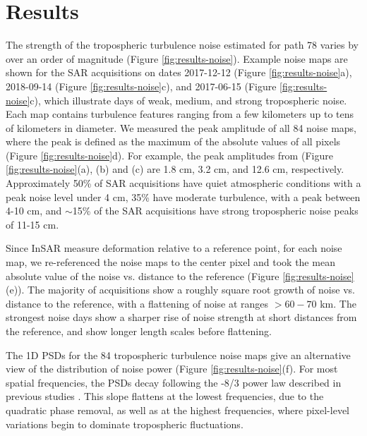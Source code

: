 \documentclass{utexasthesis}
\begin{document}
\section{Results}
\label{sec:results}

The strength of the tropospheric turbulence noise estimated for path 78 varies by over an order of magnitude (Figure \ref{fig:results-noise}). Example noise maps are shown for the SAR acquisitions on dates 2017-12-12 (Figure \ref{fig:results-noise}a), 2018-09-14 (Figure \ref{fig:results-noise}c), and 2017-06-15 (Figure \ref{fig:results-noise}c), which illustrate days of weak, medium, and strong tropospheric noise. Each map contains turbulence features ranging from a few kilometers up to tens of kilometers in diameter.  
We measured the peak amplitude of all 84 noise maps, where the peak is defined as the maximum of the absolute values of all pixels (Figure \ref{fig:results-noise}d). 
For example, the peak amplitudes from (Figure \ref{fig:results-noise}(a), (b) and (c) are 1.8 cm, 3.2 cm, and 12.6 cm, respectively.  Approximately 50\% of SAR acquisitions have quiet atmospheric conditions with a peak noise level under 4 cm, 35\% have moderate turbulence, with a peak between 4-10 cm, and $\sim$15\% of the SAR acquisitions have strong tropospheric noise peaks of 11-15 cm. 

Since InSAR measure deformation relative to a reference point, for each noise map, we re-referenced the noise maps to the center pixel and took the mean absolute value of the noise vs. distance to the reference (Figure \ref{fig:results-noise}(e)). The majority of acquisitions show a roughly square root growth of noise vs. distance to the reference, with a flattening of noise at ranges $>60-70$ km. The strongest noise days show a sharper rise of noise strength at short distances from the reference, and show longer length scales before flattening.


The 1D PSDs for the 84 tropospheric turbulence noise maps give an alternative view of the distribution of noise power (Figure \ref{fig:results-noise}(f). For most spatial frequencies, the PSDs decay following the -8/3 power law described in previous studies \citep{Hanssen2001RadarInterferometryData, Onn2006ModelingWaterVapor}. This slope flattens at the lowest frequencies, due to the quadratic phase removal, as well as at the highest frequencies, where pixel-level variations begin to dominate tropospheric fluctuations.
\end{document}

